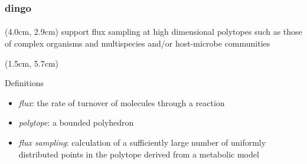 \documentclass{beamer}
\begin{document}
   \begin{darkframes}
      \begin{frame}
         \frametitle{\textbf{dingo} }
         \framesubtitle{
         }


         \small


         \begin{textblock*}{7cm}(4.0cm, 2.9cm)
            \bigskip
            support flux sampling at high dimensional polytopes 
            such as those of complex organisms and multispecies and/or host-microbe communities 
         \end{textblock*}

         \begin{textblock*}{10cm}(1.5cm, 5.7cm)
            \begin{block}{Definitions}
               \footnotesize
               \begin{itemize}
                  \item \textit{flux}: the rate of turnover of molecules through a reaction
                  \item \textit{polytope}: a bounded polyhedron
                  \item \textit{flux sampling}: calculation of a sufficiently large number of uniformly distributed points in the polytope derived from a metabolic model
               \end{itemize}
            \end{block}
               
         \end{textblock*}




\end{frame}
\end{darkframes}
\end{document}
